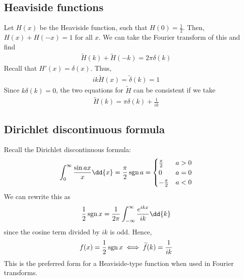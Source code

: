 \subsection{Heaviside functions}
Let $H(x)$ be the Heaviside function, such that $H(0) = \frac{1}{2}$.
Then, $H(x) + H(-x) = 1$ for all $x$.
We can take the Fourier transform of this and find
\begin{align*}
	\widetilde H(k) + \widetilde H(-k) = 2\pi \delta(k)
\end{align*}
Recall that $H'(x) = \delta(x)$.
Thus,
\begin{align*}
	ik \widetilde H(x) = \widetilde \delta(k) = 1
\end{align*}
Since $k \delta(k) = 0$, the two equations for $\widetilde H$ can be consistent if we take
\begin{align*}
	\widetilde H(k) = \pi\delta(k) + \frac{1}{ik}
\end{align*}

\subsection{Dirichlet discontinuous formula}
Recall the Dirichlet discontinuous formula:
\begin{align*}
	\int_0^\infty \frac{\sin ax}{x} \dd{x} = \frac{\pi}{2} \sgn a = \begin{cases}
		\frac{\pi}{2}  & a > 0 \\
		0              & a = 0 \\
		-\frac{\pi}{2} & a < 0
	\end{cases}
\end{align*}
We can rewrite this as
\begin{align*}
	\frac{1}{2} \sgn x = \frac{1}{2\pi} \int_{-\infty}^\infty \frac{e^{ikx}}{ik} \dd{k}
\end{align*}
since the cosine term divided by $ik$ is odd.
Hence,
\begin{align*}
	f(x) = \frac{1}{2} \operatorname{sgn} x \iff \widetilde f(k) = \frac{1}{ik}
\end{align*}
This is the preferred form for a Heaviside-type function when used in Fourier transforms.

